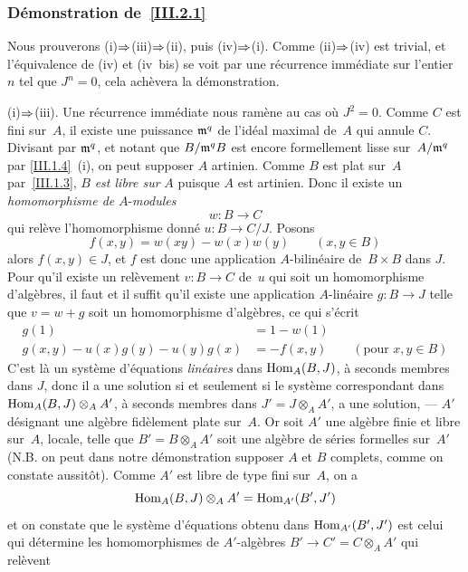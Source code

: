 \subsubsection*{D\'emonstration de~\ref{III.2.1}}
Nous prouverons (i)$\To$(iii)$\To$(ii), puis (iv)$\To$(i). Comme (ii)$\To$(iv) est trivial, et
l'\'equivalence de (iv) et (iv~bis) se voit par une r\'ecurrence
imm\'ediate sur l'entier $n$ tel que $J^n = 0$, cela ach\`evera la
d\'emonstration.

(i)$\To$(iii). Une r\'ecurrence imm\'ediate nous
ram\`ene au cas o\`u $J^2 = 0$. Comme $C$ est fini sur~$A$, il
existe une puissance $\mathfrak{m}^q$ de l'id\'eal maximal de~$A$ qui annule
$C$. Divisant par $\mathfrak{m}^q$, et notant que $B/\mathfrak{m}^qB$ est
encore formellement lisse
sur~$A/\mathfrak{m}^q$ par \ref{III.1.4}~(i), on peut supposer $A$
artinien. Comme $B$ est plat sur~$A$ par~\ref{III.1.3}, $B$ \emph{est
libre sur} $A$ puisque $A$ est artinien. Donc il existe un
\emph{homomorphisme de} $A$-\emph{modules}
$$
w \colon B \to C
$$
qui rel\`eve l'homomorphisme donn\'e $u \colon B \to C/J$. Posons
$$
f(x,y) = w(xy) - w(x)w(y) \qquad (x,y \in B)
$$
alors $f(x,y) \in J$, et $f$ est donc une application
$A$-bilin\'eaire de~$B \times B$ dans $J$. Pour qu'il existe un
rel\`evement $v \colon B \to C$ de~$u$ qui soit un homomorphisme
d'alg\`ebres, il faut et il suffit qu'il existe une application
$A$-lin\'eaire $g \colon B \to J$ telle que $v = w + g$ soit un
homomorphisme d'alg\`ebres, ce qui s'\'ecrit
\begin{align*}
g(1) &= 1 - w(1) \\
g(x,y) - u(x)g(y) -u(y)g(x) &= -f(x,y) \qquad (\text{pour } x,y \in
B)
\end{align*}
C'est l\`a un syst\`eme d'\'equations \emph{linéaires} dans
$\operatorname{Hom}_A(B,J)$, \`a seconds membres dans $J$, donc il a une solution
si et seulement si le syst\`eme correspondant dans $\operatorname{Hom}_A(B,J)
\otimes_A A'$, \`a seconds membres dans $J' = J \otimes_A A'$, a une
solution, --- $A'$ d\'esignant une alg\`ebre fid\`element plate
sur~$A$. Or soit $A'$ une alg\`ebre finie et libre sur~$A$, locale,
telle que $B' = B \otimes_A A'$ soit une alg\`ebre de s\'eries
formelles sur~$A'$ (N.B. on peut dans notre d\'emonstration supposer
$A$ et $B$ complets, comme on constate aussit\^ot). Comme $A'$ est
libre de type fini sur~$A$, on a
$$
\operatorname{Hom}_A(B,J) \otimes_A A' = \operatorname{Hom}_{A'}(B',J')
$$
et on constate que le syst\`eme d'\'equations obtenu dans
$\operatorname{Hom}_{A'}(B',J')$ est celui qui d\'etermine les homomorphismes de
$A'$-alg\`ebres $B' \to C' = C \otimes_A A'$ qui rel\`event
